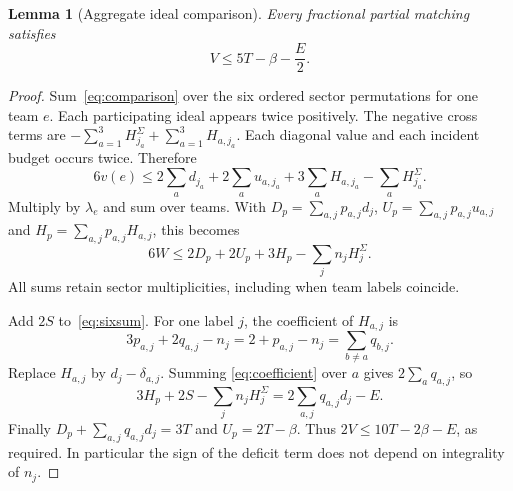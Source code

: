 \documentclass[11pt]{article}
\newtheorem{lemma}[theorem]{Lemma}
\theoremstyle{remark}
\begin{document}
\begin{lemma}[Aggregate ideal comparison]\label{lem:aggregate}
Every fractional partial matching satisfies
\begin{equation}\label{eq:aggregate}
                          V\le5T-\beta-\frac E2.
\end{equation}
\end{lemma}
\begin{proof}
Sum~\eqref{eq:comparison} over the six ordered sector permutations for
one team $e$. Each participating ideal appears twice positively. The
negative cross terms are
$-\sum_{a=1}^3 H_{j_a}^\Sigma+\sum_{a=1}^3H_{a,j_a}$.
Each diagonal value and each incident budget occurs twice. Therefore
\[
 6v(e)\le2\sum_ad_{j_a}+2\sum_au_{a,j_a}
             +3\sum_aH_{a,j_a}-\sum_aH_{j_a}^\Sigma.
\]
Multiply by $\lambda_e$ and sum over teams. With
$D_p=\sum_{a,j}p_{a,j}d_j$, $U_p=\sum_{a,j}p_{a,j}u_{a,j}$ and
$H_p=\sum_{a,j}p_{a,j}H_{a,j}$, this becomes
\begin{equation}\label{eq:sixsum}
                     6W\le2D_p+2U_p+3H_p-\sum_jn_jH_j^\Sigma.
\end{equation}
All sums retain sector multiplicities, including when team labels coincide.

Add $2S$ to~\eqref{eq:sixsum}. For one label $j$, the coefficient of
$H_{a,j}$ is
\begin{equation}\label{eq:coefficient}
 3p_{a,j}+2q_{a,j}-n_j
       =2+p_{a,j}-n_j=\sum_{b\ne a}q_{b,j}.
\end{equation}
Replace $H_{a,j}$ by $d_j-\delta_{a,j}$. Summing
\eqref{eq:coefficient} over $a$ gives $2\sum_aq_{a,j}$, so
\[
 3H_p+2S-\sum_jn_jH_j^\Sigma
       =2\sum_{a,j}q_{a,j}d_j-E.
\]
Finally $D_p+\sum_{a,j}q_{a,j}d_j=3T$ and $U_p=2T-\beta$.
Thus $2V\le10T-2\beta-E$, as required. In particular the sign of the
deficit term does not depend on integrality of $n_j$.
\end{proof}
\end{document}
